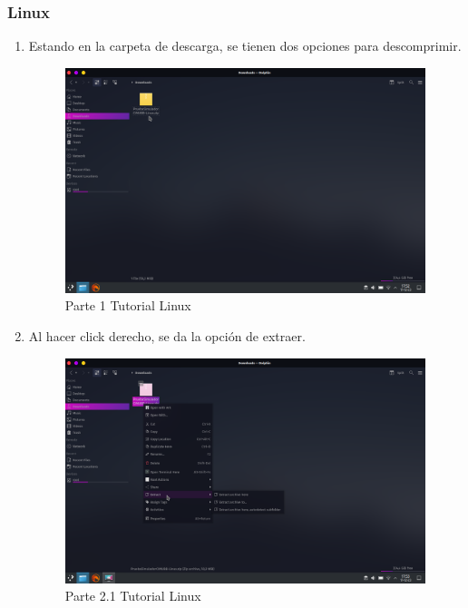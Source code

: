\subsubsection*{Linux}

\begin{enumerate}[label=\arabic*.-]
    \item Estando en la carpeta de descarga, se tienen dos opciones para descomprimir.
\begin{figure}[ht]
    \centering
    \includegraphics[width=10.5cm]{figures/TutorialLinux/tutoriallinux (1).png}
    \caption{Parte 1 Tutorial Linux}
    \label{fig:tutolinux1}
\end{figure}

    \item Al hacer click derecho, se da la opción de extraer.
\begin{figure}[ht]
    \centering
    \includegraphics[width=10.5cm]{figures/TutorialLinux/tutoriallinux (2).png}
    \caption{Parte 2.1 Tutorial Linux}
    \label{fig:tutolinux2}
\end{figure}
\clearpage


\end{enumerate}
